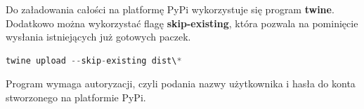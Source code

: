 \quad Do załadowania całości na platformę PyPi wykorzystuje się program \textbf{twine}. Dodatkowo można wykorzystać flagę \textbf{skip-existing}, która pozwala na pominięcie wysłania istniejących już gotowych paczek.\newline

\begin{lstlisting}[language=python, style=command, captionpos=b, caption={Wysłanie paczki na repozytorium}]
twine upload --skip-existing dist\*
\end{lstlisting}

\quad Program wymaga autoryzacji, czyli podania nazwy użytkownika i hasła do konta stworzonego na platformie PyPi. 